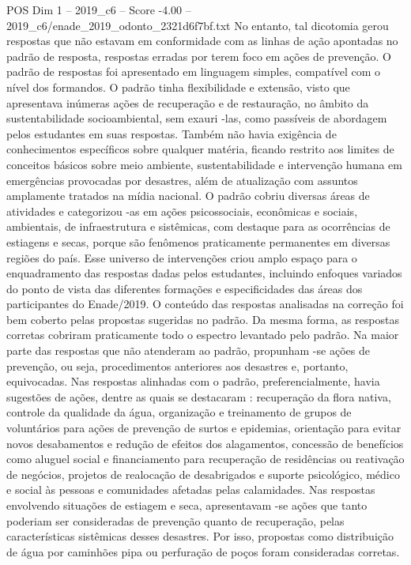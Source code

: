 \begin{textsample}{POS Dim 1 – 2019\_c6 – Score -4.00 – 2019\_c6/enade\_2019\_odonto\_2321d6f7bf.txt}
No entanto, tal dicotomia gerou respostas que não estavam em conformidade com as linhas de ação apontadas no padrão de resposta, respostas erradas por terem foco em ações de prevenção.
O padrão de respostas foi apresentado em linguagem simples, compatível com o nível dos formandos.
O padrão tinha flexibilidade e extensão, visto que apresentava inúmeras ações de recuperação e de restauração, no âmbito da sustentabilidade socioambiental, sem exauri -las, como passíveis de abordagem pelos estudantes em suas respostas.
Também não havia exigência de conhecimentos específicos sobre qualquer matéria, ficando restrito aos limites de conceitos básicos sobre meio ambiente, sustentabilidade e intervenção humana em emergências provocadas por desastres, além de atualização com assuntos amplamente tratados na mídia nacional.
O padrão cobriu diversas áreas de atividades e categorizou -as em ações psicossociais, econômicas e sociais, ambientais, de infraestrutura e sistêmicas, com destaque para as ocorrências de estiagens e secas, porque são fenômenos praticamente permanentes em diversas regiões do país.
Esse universo de intervenções criou amplo espaço para o enquadramento das respostas dadas pelos estudantes, incluindo enfoques variados do ponto de vista das diferentes formações e especificidades das áreas dos participantes do Enade/2019.
O conteúdo das respostas analisadas na correção foi bem coberto pelas propostas sugeridas no padrão.
Da mesma forma, as respostas corretas cobriram praticamente todo o espectro levantado pelo padrão.
Na maior parte das respostas que não atenderam ao padrão, propunham -se ações de prevenção, ou seja, procedimentos anteriores aos desastres e, portanto, equivocadas.
Nas respostas alinhadas com o padrão, preferencialmente, havia sugestões de ações, dentre as quais se destacaram : recuperação da flora nativa, controle da qualidade da água, organização e treinamento de grupos de voluntários para ações de prevenção de surtos e epidemias, orientação para evitar novos desabamentos e redução de efeitos dos alagamentos, concessão de benefícios como aluguel social e financiamento para recuperação de residências ou reativação de negócios, projetos de realocação de desabrigados e suporte psicológico, médico e social às pessoas e comunidades afetadas pelas calamidades.
Nas respostas envolvendo situações de estiagem e seca, apresentavam -se ações que tanto poderiam ser consideradas de prevenção quanto de recuperação, pelas características sistêmicas desses desastres.
Por isso, propostas como distribuição de água por caminhões pipa ou perfuração de poços foram consideradas corretas.

\end{textsample}
